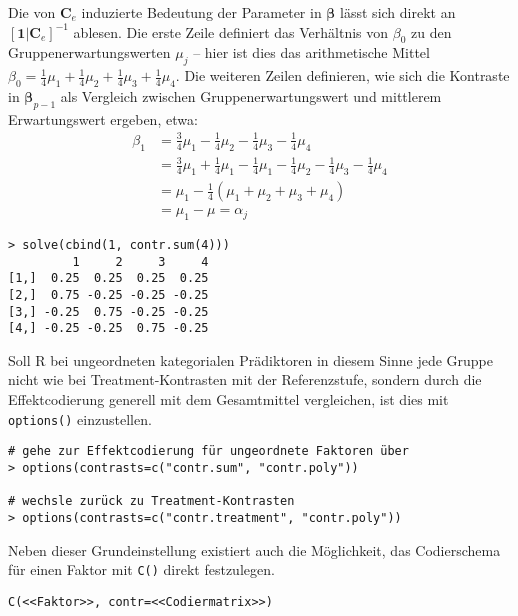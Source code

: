 Die von $\bm{C}_{e}$ induzierte Bedeutung der Parameter in $\bm{\beta}$ lässt sich direkt an $[\bm{1} | \bm{C}_{e}]^{-1}$ ablesen. Die erste Zeile definiert das Verhältnis von $\beta_{0}$ zu den Gruppenerwartungswerten $\mu_{j}$ -- hier ist dies das arithmetische Mittel $\beta_{0} = \frac{1}{4} \mu_{1} + \frac{1}{4} \mu_{2} + \frac{1}{4} \mu_{3} + \frac{1}{4} \mu_{4}$. Die weiteren Zeilen definieren, wie sich die Kontraste in $\bm{\beta}_{p-1}$ als Vergleich zwischen Gruppenerwartungswert und mittlerem Erwartungswert ergeben, etwa:
\begin{align*}
\beta_{1} &= \frac{3}{4} \mu_{1} - \frac{1}{4} \mu_{2} - \frac{1}{4} \mu_{3} - \frac{1}{4} \mu_{4}\\
          &= \frac{3}{4} \mu_{1} + \frac{1}{4} \mu_{1} - \frac{1}{4} \mu_{1} - \frac{1}{4} \mu_{2} - \frac{1}{4} \mu_{3} - \frac{1}{4} \mu_{4}\\
          &= \mu_{1} - \frac{1}{4} (\mu_{1} + \mu_{2} + \mu_{3} + \mu_{4}) \\
          &= \mu_{1} - \mu = \alpha_{j}
\end{align*}

\begin{lstlisting}
> solve(cbind(1, contr.sum(4)))
         1     2     3     4
[1,]  0.25  0.25  0.25  0.25
[2,]  0.75 -0.25 -0.25 -0.25
[3,] -0.25  0.75 -0.25 -0.25
[4,] -0.25 -0.25  0.75 -0.25
\end{lstlisting}

Soll R bei ungeordneten kategorialen Prädiktoren in diesem Sinne jede Gruppe nicht wie bei Treatment-Kontrasten mit der Referenzstufe, sondern durch die Effektcodierung generell mit dem Gesamtmittel vergleichen, ist dies mit \lstinline!options()! einzustellen.
\begin{lstlisting}
# gehe zur Effektcodierung für ungeordnete Faktoren über
> options(contrasts=c("contr.sum", "contr.poly"))

# wechsle zurück zu Treatment-Kontrasten
> options(contrasts=c("contr.treatment", "contr.poly"))
\end{lstlisting}

Neben dieser Grundeinstellung existiert auch die Möglichkeit, das Codierschema für einen Faktor mit \lstinline!C()! direkt festzulegen.
\begin{lstlisting}
C(<<Faktor>>, contr=<<Codiermatrix>>)
\end{lstlisting}

